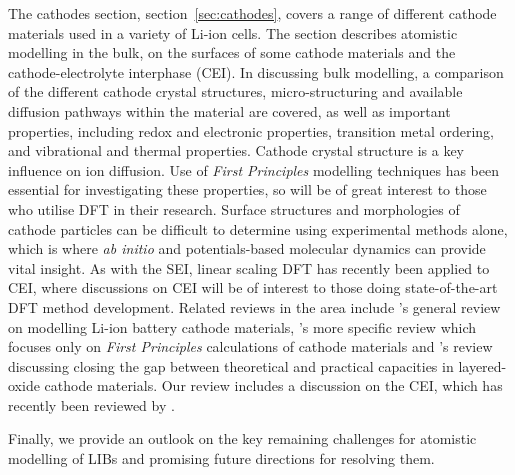 \documentclass[../main.tex]{subfiles}
\begin{document}
The cathodes section, section~\ref{sec:cathodes}, covers a range of different cathode materials used in a variety of Li-ion cells. The section describes atomistic modelling in the bulk, on the surfaces of some cathode materials and the cathode-electrolyte interphase (CEI). In discussing bulk modelling, a comparison of the different cathode crystal structures, micro-structuring and available diffusion pathways within the material are covered, as well as important properties, including redox and electronic properties, transition metal ordering, and vibrational and thermal properties. Cathode crystal structure is a key influence on ion diffusion. Use of \textit{First Principles} modelling techniques has been essential for investigating these properties, so will be of great interest to those who utilise DFT in their research. Surface structures and morphologies of cathode particles can be difficult to determine using experimental methods alone, which is where \textit{ab initio} and potentials-based molecular dynamics can provide vital insight. As with the SEI, linear scaling DFT has recently been applied to CEI, where discussions on CEI will be of interest to those doing state-of-the-art DFT method development. Related reviews in the area include \citeauthor{ma2018computer}'s \cite{ma2018computer} general review on modelling Li-ion battery cathode materials, \citeauthor{yan2014review}'s \cite{yan2014review} more specific review which focuses only on \textit{First Principles} calculations of cathode materials and \citeauthor{wang2018reviving}'s \cite{wang2018reviving} review discussing closing the gap between theoretical and practical capacities in layered-oxide cathode materials. Our review includes a discussion on the CEI, which has recently been reviewed by \citeauthor{maleki2019controllable} \cite{maleki2019controllable}.

Finally, we provide an outlook on the key remaining challenges for atomistic modelling of LIBs and promising future directions for resolving them.
\end{document}
